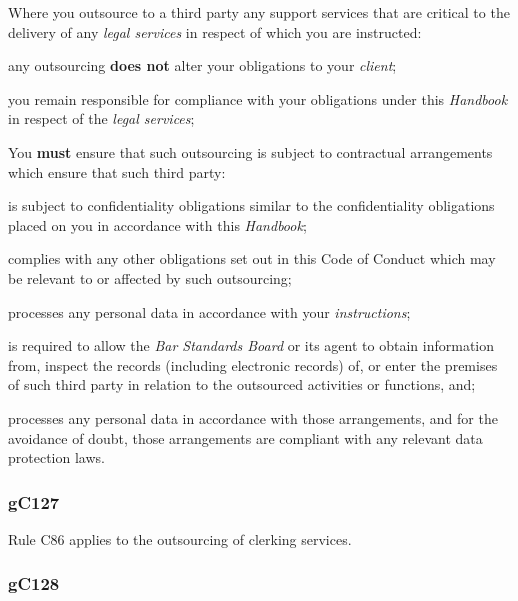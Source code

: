 


Where you outsource to a third party any support services that are
critical to the delivery of any \emph{legal services} in respect of
which you are instructed:
\begin{numlist}\item any outsourcing \textcolor{myred}{\textbf{does not}} alter your obligations to your
\emph{client};
\item you remain responsible for compliance with your obligations under
this \emph{Handbook} in respect of the \emph{legal services};
\item You \textcolor{myred}{\textbf{must}} ensure that such outsourcing is subject to contractual
arrangements which ensure that such third party:
\begin{alphlist}\item is subject to confidentiality obligations similar to the
confidentiality obligations placed on you in accordance with this
\emph{Handbook};
\item complies with any other obligations set out in this Code of Conduct
which may be relevant to or affected by such outsourcing;
\item processes any personal data in accordance with your
\emph{instructions};
\item is required to allow the \emph{Bar Standards Board} or its agent to
obtain information from, inspect the records (including electronic
records) of, or enter the premises of such third party in relation to
the outsourced activities or functions, and;
\item processes any personal data in accordance with those arrangements,
and for the avoidance of doubt, those arrangements are compliant with
any relevant data protection laws.\end{alphlist}
\end{numlist}



\subsubsection{\color{darkgrey}gC127}

Rule C86 applies to the outsourcing of clerking services.

\subsubsection{\color{darkgrey}gC128}

